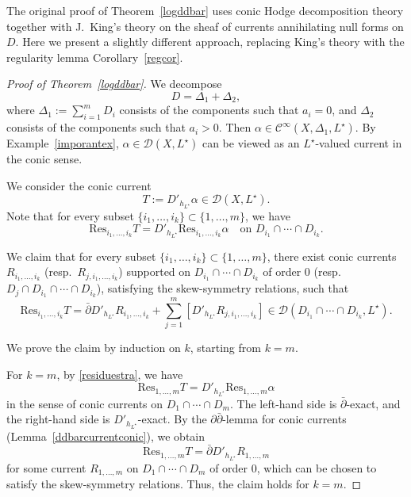 \documentclass[english]{amsart}
\newcommand{\ddbar}{\partial\bar{\partial}}
\newcommand{\Res}{\mathrm{Res}}
\newcommand{\dbar}{\bar \partial}
\numberwithin{equation}{thm}
\begin{document}
	The original proof of Theorem~\ref{logddbar} uses conic Hodge decomposition theory together with J.~King's theory \cite{Kin71,Kin83} on the sheaf of currents annihilating null forms on $D$. Here we present a slightly different approach, replacing King’s theory with the regularity lemma Corollary~\ref{regcor}. 
	
	\begin{proof}[Proof of Theorem~\ref{logddbar}]
		We decompose
		\[
		D = \Delta_1 + \Delta_2,
		\]
		where $\Delta_1 := \sum_{i=1}^m D_i$ consists of the components such that $a_i = 0$, and $\Delta_2$ consists of the components such that $a_i > 0$.
		Then $\alpha \in \mathcal{C}^\infty(X,\Delta_1,L^\star)$. By Example~\ref{imporantex}, $\alpha \in \mathcal{D}(X,L^\star)$ can be viewed as an $L^\star$-valued current in the conic sense.
		
		We consider the conic current
		\[
		T := D'_{h_{L^\star}} \alpha \in \mathcal{D}(X,L^\star).
		\]
		Note that for every subset $\{i_1,\dots,i_k\} \subset \{1,\dots,m\}$, we have
		\begin{equation}\label{residuestra}
			\Res_{i_1,\dots,i_k} T
			= D'_{h_{L^\star}} \Res_{i_1,\dots,i_k} \alpha
			\quad \text{on } D_{i_1} \cap \cdots \cap D_{i_k}.
		\end{equation}
		
		We claim that for every subset $\{i_1,\dots,i_k\} \subset \{1,\dots,m\}$, there exist conic currents $R_{i_1,\dots,i_k}$ (resp.~$R_{j,i_1,\dots,i_k}$) supported on $D_{i_1}\cap\cdots\cap D_{i_k}$ of order $0$ (resp.~$D_j\cap D_{i_1}\cap\cdots\cap D_{i_k}$), satisfying the skew-symmetry relations, such that
		\begin{equation}\label{claimfin}
			\Res_{i_1,\dots,i_k} T
			= \dbar D'_{h_{L^\star}} R_{i_1,\dots,i_k}
			+ \sum_{j=1}^m [D'_{h_{L^\star}} R_{j,i_1,\dots,i_k}]
			\in \mathcal{D}(D_{i_1}\cap\cdots\cap D_{i_k},L^\star).
		\end{equation}
		
		We prove the claim by induction on $k$, starting from $k=m$.
		
		For $k=m$, by \eqref{residuestra}, we have
		\[
		\Res_{1,\dots,m} T
		= D'_{h_{L^\star}} \Res_{1,\dots,m} \alpha
		\]
		in the sense of conic currents on $D_1 \cap \cdots \cap D_m$.
		The left-hand side is $\dbar$-exact, and the right-hand side is $D'_{h_{L^\star}}$-exact. By the $\ddbar$-lemma for conic currents (Lemma~\ref{ddbarcurrentconic}), we obtain
		\[
		\Res_{1,\dots,m} T
		= \dbar D'_{h_{L^\star}} R_{1,\dots,m}
		\]
		for some current $R_{1,\dots,m}$ on $D_1 \cap \cdots \cap D_m$ of order $0$, which can be chosen to satisfy the skew-symmetry relations. Thus, the claim holds for $k=m$.
		

\end{proof}
\end{document}
